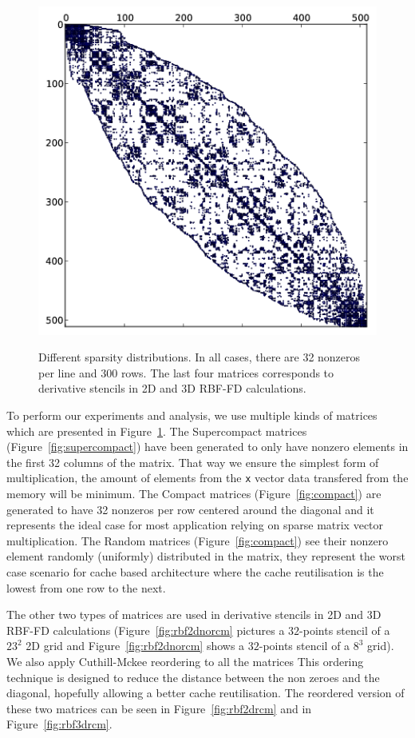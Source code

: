 \documentclass[10pt,conference,compsocconf]{IEEEtran}
\begin{document}
\begin{figure}[tbh]
\begin{center}
{      \includegraphics[width=\ww]{figures/kd-tree-3d-rcm-crop.png}}%
  \end{center}
  
  \caption{Different sparsity distributions. In all cases, there are
    32 nonzeros per line and 300 rows. The last four matrices
    corresponds to derivative stencils in 2D and 3D RBF-FD
    calculations.}
  \label{fig:spy_plots}
\end{figure}

To perform our experiments and analysis, we use multiple kinds of
matrices which are presented in Figure~\ref{fig:spy_plots}. The
Supercompact matrices (Figure~\ref{fig:supercompact}) have been
generated to only have nonzero elements in the first 32 columns of
the matrix. That way we ensure the simplest form of multiplication,
the amount of elements from the {\tt x} vector data transfered from
the memory will be minimum. The Compact matrices
(Figure~\ref{fig:compact}) are generated to have 32 nonzeros per row
centered around the diagonal and it represents the ideal case for most
application relying on sparse matrix vector multiplication. The Random
matrices (Figure~\ref{fig:compact}) see their nonzero element
randomly (uniformly) distributed in the matrix, they represent the
worst case scenario for cache based architecture where the cache
reutilisation is the lowest from one row to the next.

The other two types of matrices are used in derivative stencils in 2D
and 3D RBF-FD calculations (Figure~\ref{fig:rbf2dnorcm} pictures a
$32$-points stencil of a $23^2$ 2D grid and
Figure~\ref{fig:rbf2dnorcm} shows a $32$-points stencil of a $8^3$
grid). We also apply Cuthill-Mckee reordering to all the matrices This
ordering technique is designed to reduce the distance between the non
zeroes and the diagonal, hopefully allowing a better cache
reutilisation. The reordered version of these two matrices can be seen
in Figure~\ref{fig:rbf2drcm} and in Figure~\ref{fig:rbf3drcm}.
\end{document}
